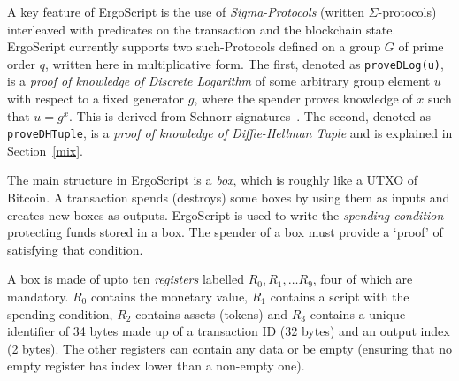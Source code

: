 \documentclass[11pt]{article}
\newcommand{\langname}{ErgoScript\xspace}
\begin{document}
A key feature of \langname is the use of {\em Sigma-Protocols} (written $\Sigma$-protocols)\cite{Dam10} interleaved with predicates on the transaction and the blockchain state. \langname currently supports two such-Protocols defined on a group $G$ of prime order $q$, written here in multiplicative form. 
The first, denoted as \texttt{proveDLog(u)}, is a {\em proof of knowledge of Discrete Logarithm} of some arbitrary group element $u$ with respect to a fixed generator $g$, where the spender proves knowledge of $x$ such that $u = g^x$.
This is derived from Schnorr signatures~\cite{Sch91}. The second, denoted as \texttt{proveDHTuple}, is a {\em proof of knowledge of Diffie-Hellman Tuple} and is explained in Section~\ref{mix}.


The main structure in \langname is a \emph{box}, which is roughly like a UTXO of Bitcoin. A transaction spends (destroys) some boxes by using them as inputs and creates new boxes as outputs.  \langname is used to write the {\em spending condition} protecting funds stored in a box. The spender of a box must provide a `proof' of satisfying that condition. 

A box is made of upto ten {\em registers} labelled $R_0, R_1,\ldots R_9$, four of which are mandatory. $R_0$ contains the monetary value, $R_1$ contains a script with the spending condition, $R_2$ contains assets (tokens) and $R_3$ contains a unique identifier of 34 bytes made up of a transaction ID (32 bytes) and an output index (2 bytes). The other registers can contain any data or be empty (ensuring that no empty register has index lower than a non-empty one).


\end{document}
